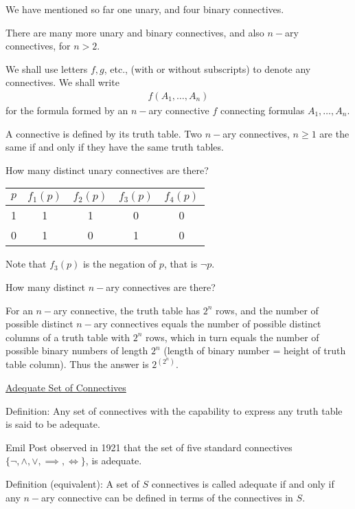 \documentclass{article}
\begin{document}
We have mentioned so far one unary, and four binary connectives.

There are many more unary and binary connectives, and also $n-$ary connectives, for $n > 2$. 

We shall use letters $f, g$, etc., (with or without subscripts) to denote any connectives. We shall write
\begin{align*}
f(A_1, \ldots, A_n)
\end{align*}
for the formula formed by an $n-$ary connective $f$ connecting formulas $A_1, \ldots, A_n$.

A connective is defined by its truth table. Two $n-$ary connectives, $n \ge 1$ are the same if and only if they have the same truth tables. 

How many distinct unary connectives are there?

\begin{table}[h]
    \centering
    \begin{tabular}{|c|c|c|c|c|}\hline
    $p$ & $f_1(p)$ & $f_2(p)$ & $f_3(p)$ & $f_4(p)$ \\ \hline
    1 & 1 & 1 & 0 & 0 \\ 
    0 & 1 & 0 & 1 & 0 \\ \hline
\end{tabular}
\end{table}

Note that $f_3(p)$ is the negation of $p$, that is $\neg p$. 

How many distinct $n-$ary connectives are there? 

For an $n-$ary connective, the truth table has $2^n$ rows, and the number of possible distinct $n-$ary connectives equals the number of possible distinct columns of a truth table with $2^n$ rows, which in turn equals the number of possible binary numbers of length $2^n$ (length of binary number = height of truth table column). Thus the answer is $2^{(2^n)}$.

\underline{Adequate Set of Connectives}

Definition: Any set of connectives with the capability to express any truth table is said to be adequate. 

Emil Post observed in 1921 that the set of five standard connectives $\{\neg, \wedge, \vee, \implies, \iff \}$, is adequate.

Definition (equivalent): A set of $S$ connectives is called adequate if and only if any $n-$ary connective can be defined in terms of the connectives in $S$. 
\end{document}
